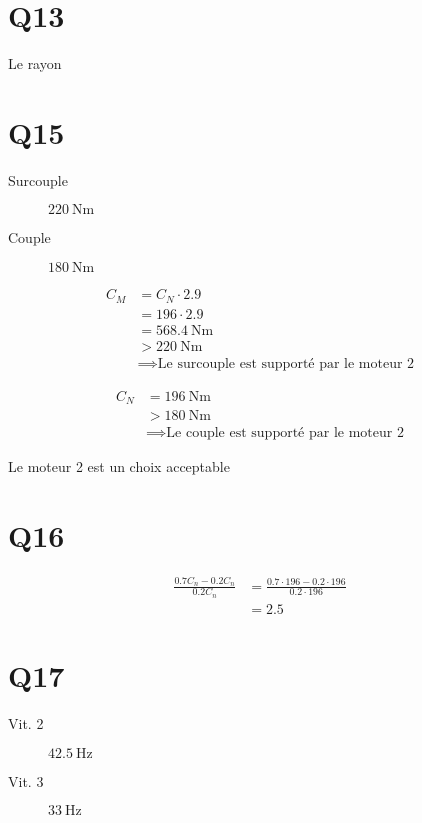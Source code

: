 \documentclass{article}
\begin{document}
\section{Q13}

Le rayon

\section{Q15}

\begin{description}
  \item[Surcouple] $\SI{220}{\newton\meter}$
  \item[Couple] $\SI{180}{\newton\meter}$
\end{description}

\begin{equation*}
  \begin{split}
    C_M &= C_N \cdot 2.9 \\
    &= 196 \cdot 2.9 \\
    &= \SI{568.4}{\newton\meter} \\
    &> \SI{220}{\newton\meter} \\
    &\implies \text{Le surcouple est supporté par le moteur 2}
  \end{split}
\end{equation*}

\begin{equation*}
  \begin{split}
    C_N &= \SI{196}{\newton\meter} \\
    &> \SI{180}{\newton\meter} \\
    &\implies \text{Le couple est supporté par le moteur 2}
  \end{split}
\end{equation*}

Le moteur 2 est un choix acceptable

\section{Q16}

\begin{equation*}
  \begin{split}
    \frac{0.7C_n - 0.2C_n}{0.2C_n} &= \frac{0.7\cdot196 - 0.2\cdot196}{0.2\cdot196} \\
    &= 2.5
  \end{split}
\end{equation*}

\section{Q17}

\begin{description}
  \item[Vit. 2] $\SI{42.5}{\hertz}$
  \item[Vit. 3] $\SI{33}{\hertz}$
\end{description}
\end{document}
